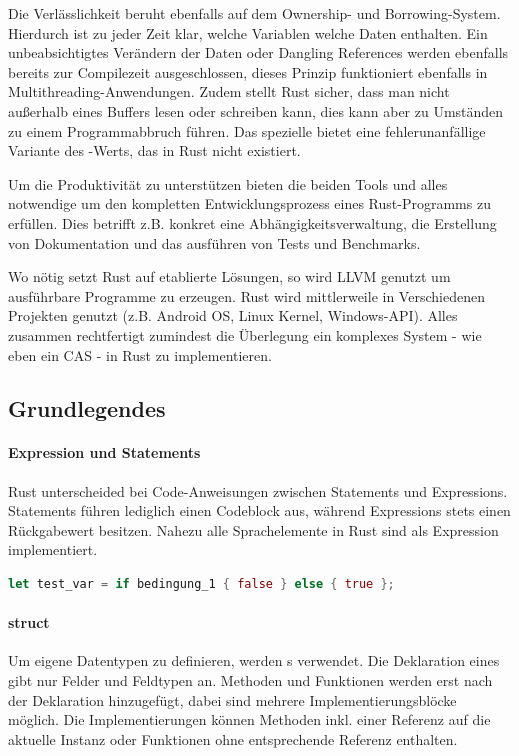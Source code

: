 \documentclass[11pt,a4paper, ngerman]{article}
\begin{document}
Die Verlässlichkeit beruht ebenfalls auf dem Ownership- und Borrowing-System. Hierdurch ist zu jeder Zeit klar, welche Variablen welche Daten enthalten. Ein unbeabsichtigtes Verändern der Daten oder Dangling References werden ebenfalls bereits zur Compilezeit ausgeschlossen, dieses Prinzip funktioniert ebenfalls in Multithreading-Anwendungen. Zudem stellt Rust sicher, dass man nicht außerhalb eines Buffers lesen oder schreiben kann, dies kann aber zu Umständen zu einem Programmabbruch führen. Das spezielle   bietet eine fehlerunanfällige Variante des -Werts, das in Rust nicht existiert.

Um die Produktivität zu unterstützen bieten die beiden Tools  und  alles notwendige um den kompletten Entwicklungsprozess eines Rust-Programms zu erfüllen. Dies betrifft z.B. konkret eine Abhängigkeitsverwaltung, die Erstellung von Dokumentation und das ausführen von Tests und Benchmarks.

Wo nötig setzt Rust auf etablierte Lösungen, so wird LLVM genutzt um ausführbare Programme zu erzeugen. Rust wird mittlerweile in Verschiedenen Projekten genutzt (z.B. Android OS, Linux Kernel, Windows-API). Alles zusammen rechtfertigt zumindest die Überlegung ein komplexes System - wie eben ein CAS - in Rust zu implementieren.

\subsection{Grundlegendes}
\paragraph{Expression und Statements} Rust unterscheided bei Code-Anweisungen zwischen Statements und Expressions. Statements führen lediglich einen Codeblock aus, während Expressions stets einen Rückgabewert besitzen. Nahezu alle Sprachelemente in Rust sind als Expression implementiert.

\begin{lstlisting}[language=rust, caption={Expression Einführendes Beispiel}]
    let test_var = if bedingung_1 { false } else { true };
\end{lstlisting}

\paragraph{struct} Um eigene Datentypen zu definieren, werden s verwendet. Die Deklaration eines  gibt nur Felder und Feldtypen an. Methoden und Funktionen werden erst nach der Deklaration hinzugefügt, dabei sind mehrere Implementierungsblöcke möglich. Die Implementierungen können Methoden inkl. einer Referenz auf die aktuelle Instanz oder Funktionen ohne entsprechende Referenz enthalten.
\end{document}
